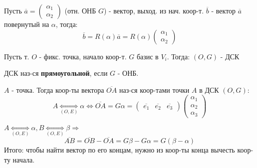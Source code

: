 \begin{task}
Пусть $\overline{a} = \begin{pmatrix}\alpha_1 \\ \alpha_2 \end{pmatrix}$ (отн. ОНБ $G$) - вектор, выход. из нач. коор-т. $\overline{b}$ - вектор $\overline{a}$ повернутый на $\alpha$, тогда:
\[
\overline{b} = R(\alpha) \overline{a} = R(\alpha) \begin{pmatrix}\alpha_1 \\ \alpha_2 \end{pmatrix}
\] 
\end{task}

\begin{definition}
Пусть т. $O$ - фикс. точка, начало коор-т. $G$ базис в $V_i$. Тогда:
    $(O, G)$ - ДСК
\end{definition}
\begin{definition}
    ДСК наз-ся \textbf{прямоугольной}, если $G$ - ОНБ.
\end{definition}
\begin{definition}
    $A$ - точка. Тогда коор-ты вектора $\overline{OA}$ наз-ся коор-тами точки $A$ в ДСК $(O, G)$:
    \[
        A \underset{(O, E)}{\Longleftrightarrow} \alpha \iff \overline{OA} = G\alpha = \begin{pmatrix}\overline{e_1} & \overline{e_2} & \overline{e_3} \end{pmatrix} \begin{pmatrix}\alpha_1 \\\alpha_2 \\ \alpha_3 \end{pmatrix}
    \] 
\end{definition}
\begin{statement}
$A \underset{(O, E)}{\Longleftrightarrow} \alpha, B \underset{(O, E)}{\Longleftrightarrow} \beta \Rightarrow$
\[
\overline{AB} = \overline{OB} - \overline{OA} = G\beta - G\alpha = G(\beta - \alpha)
\] 
Итого: чтобы найти вектор по его концам, нужно из коор-ты конца вычесть коор-ту начала.
\end{statement}

